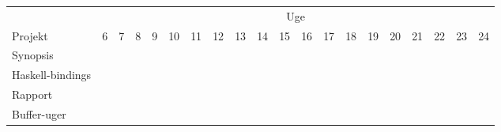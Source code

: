 \documentclass[a4paper,oneside, draft]{memoir}
\begin{document}
\noindent
\begin{landscape}
\begin{center}



\begin{tabular}{l||ccccccccccccccccccc}
& \multicolumn{19}{c}{Uge} \\
Projekt & 6 & 7 & 8 & 9 & 10 & 11 & 12 & 13 & 14 & 15 & 16 & 17 & 18 &
19 & 20 & 21 & 22 & 23 & 24\\ \hline \hline
Synopsis & \multicolumn{3}{c}{\cellcolor{black}} & & & &
&&&&&&&&&&&&\\  
Haskell-bindings & & & \multicolumn{2}{c}{\cellcolor{red}} \\  
Rapport & & & & \multicolumn{5}{c}{\cellcolor{lightgrey}} &  \multicolumn{8}{c}{\cellcolor{grey}}\\  
Buffer-uger & \multicolumn{16}{c}{} & \multicolumn{3}{c}{\cellcolor{blue}} \\  
\end{tabular}
\end{center}
\end{landscape}
\end{document}
